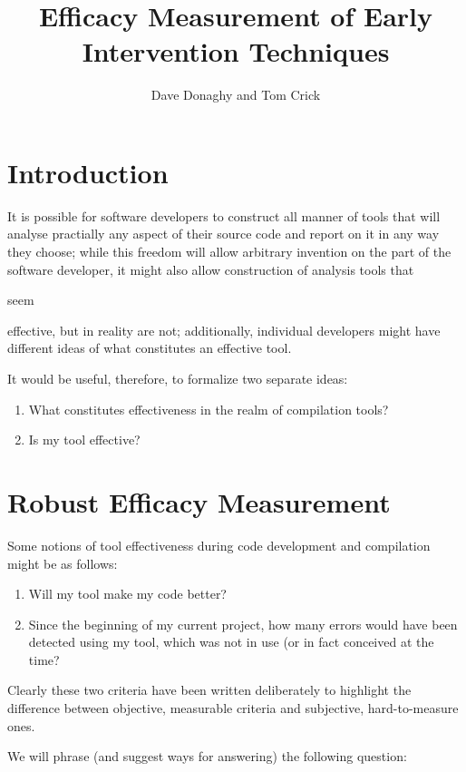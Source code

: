 \documentclass{eceasst}
\title{Efficacy Measurement of Early Intervention Techniques} %
\author{%
Dave Donaghy\autref{1} and
Tom Crick\autref{2}}
\institute{%
\autlabel{1} \email{dave.donaghy@hp.com}\\
HP Bristol, UK\par
\autlabel{2} \email{tcrick@cardiffmet.ac.uk}\\
Department of Computing\\
Cardiff Metropolitan University, UK}
\begin{document}
\maketitle

\section{Introduction}

It is possible for software developers to construct all manner of tools
that will analyse practially any aspect of their source code and report
on it in any way they choose; while this freedom will allow arbitrary
invention on the part of the software developer, it might also allow
construction of analysis tools that \begin{em}seem\end{em} effective,
but in reality are not; additionally, individual developers might have
different ideas of what constitutes an effective tool.

It would be useful, therefore, to formalize two separate ideas:

\begin{enumerate}
\item What constitutes effectiveness in the realm of compilation tools?
\item Is my tool effective?
\end{enumerate}

\section{Robust Efficacy Measurement}

Some notions of tool effectiveness during code development and compilation
might be as follows:

\begin{enumerate}
\item Will my tool make my code better?
\item Since the beginning of my current project, how many errors would
have been detected using my tool, which was not in use (or in fact
conceived at the time?
\end{enumerate}

Clearly these two criteria have been written deliberately to highlight
the difference between objective, measurable criteria and subjective,
hard-to-measure ones.

We will phrase (and suggest ways for answering) the following question:
\end{document}
